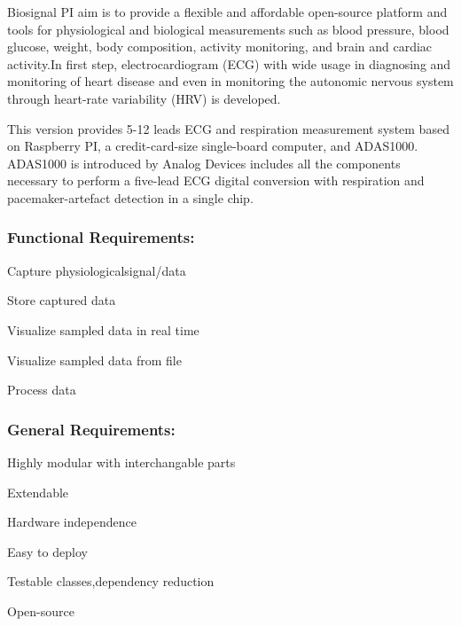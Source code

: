 Biosignal PI aim is to provide a flexible and affordable open-\/source platform and tools for physiological and biological measurements such as blood pressure, blood glucose, weight, body composition, activity monitoring, and brain and cardiac activity.\+In first step, electrocardiogram (E\+CG) with wide usage in diagnosing and monitoring of heart disease and even in monitoring the autonomic nervous system through heart-\/rate variability (H\+RV) is developed.

This version provides 5-\/12 leads E\+CG and respiration measurement system based on Raspberry PI, a credit-\/card-\/size single-\/board computer, and A\+D\+A\+S1000. A\+D\+A\+S1000 is introduced by Analog Devices includes all the components necessary to perform a five-\/lead E\+CG digital conversion with respiration and pacemaker-\/artefact detection in a single chip. 



\subsubsection*{Functional Requirements\+:}


\begin{DoxyItemize}
\item Capture physiologicalsignal/data
\item Store captured data
\item Visualize sampled data in real time
\item Visualize sampled data from file
\item Process data
\end{DoxyItemize}

\subsubsection*{General Requirements\+:}


\begin{DoxyItemize}
\item Highly modular with interchangable parts
\item Extendable
\item Hardware independence
\item Easy to deploy
\item Testable classes,dependency reduction
\item Open-\/source 
\end{DoxyItemize}